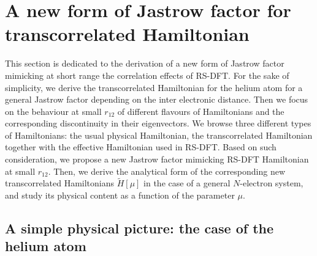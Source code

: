 \documentclass[aip,jcp,reprint,noshowkeys,superscriptaddress]{revtex4-1}
\begin{document}
\section{A new form of Jastrow factor for transcorrelated Hamiltonian}
This section is dedicated to the derivation of a new form of Jastrow factor mimicking at short range the correlation effects of RS-DFT. 
For the sake of simplicity, we derive the transcorrelated Hamiltonian for the helium atom for a general Jastrow factor depending on the inter electronic distance.  
Then we focus on the behaviour at small $r_{12}$ of different flavours of Hamiltonians 
and the corresponding discontinuity in their eigenvectors. 
We browse three different types of Hamiltonians: the usual physical Hamiltonian, the transcorrelated Hamiltonian together with the effective Hamiltonian used in RS-DFT.
Based on such consideration, we propose a new Jastrow factor mimicking RS-DFT Hamiltonian at small $r_{12}$. 
Then, we derive the analytical form of the corresponding new transcorrelated Hamiltonians $\tilde{H}[\mu]$ in the case of a general $N$-electron system, and study its physical content as a  function of the parameter $\mu$. 

\subsection{A simple physical picture: the case of the helium atom}
\end{document}
